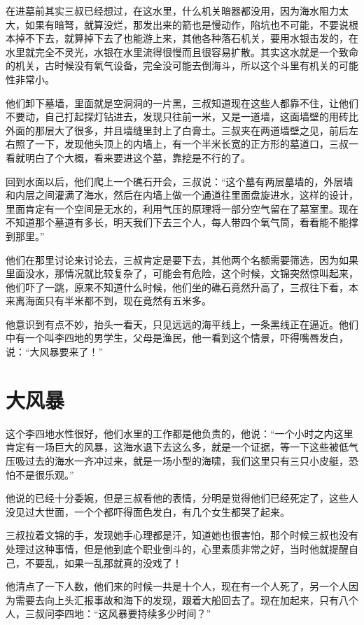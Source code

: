 在进墓前其实三叔已经想过，在这水里，什么机关暗器都没用，因为海水阻力太大，如果有暗弩，就算没烂，那发出来的箭也是慢动作，陷坑也不可能，不要说根本掉不下去，就算掉下去了也能游上来，其他各种落石机关，要用水银击发的，在水里就完全不灵光，水银在水里流得很慢而且很容易扩散。其实这水就是一个致命的机关，古时候没有氧气设备，完全没可能去倒海斗，所以这个斗里有机关的可能性非常小。

他们卸下墓墙，里面就是空洞洞的一片黑，三叔知道现在这些人都靠不住，让他们不要动，自己打起探灯钻进去，发现只往前一米，又是一道墙，这面墙壁的用砖比外面的那层大了很多，并且墙缝里封上了白膏土。三叔夹在两道墙壁之见，前后左右照了一下，发现他头顶上的内墙上，有一个半米长宽的正方形的墓道口，三叔一看就明白了个大概，看来要进这个墓，靠挖是不行的了。

回到水面以后，他们爬上一个礁石开会，三叔说：“这个墓有两层墓墙的，外层墙和内层之间灌满了海水，然后在内墙上做一个通道往里面盘旋进水，这样的设计，里面肯定有一个空间是无水的，利用气压的原理将一部分空气留在了墓室里。现在不知道那个墓道有多长，明天我们下去三个人，每人带四个氧气筒，看看能不能撑到那里。”

他们在那里讨论来讨论去，三叔肯定是要下去，其他两个名额需要筛选，因为如果里面没水，那情况就比较复杂了，可能会有危险，这个时候，文锦突然惊叫起来，他们吓了一跳，原来不知道什么时候，他们坐的礁石竟然升高了，三叔往下看，本来离海面只有半米都不到，现在竟然有五米多。

他意识到有点不妙，抬头一看天，只见远远的海平线上，一条黑线正在逼近。他们中有一个叫李四地的男学生，父母是渔民，他一看到这个情景，吓得嘴唇发白，说：“大风暴要来了！”

\chapter{大风暴}

这个李四地水性很好，他们水里的工作都是他负责的，他说：“一个小时之内这里肯定有一场巨大的风暴，这海水退下去这么多，就是一个证据，等一下这些被低气压吸过去的海水一齐冲过来，就是一场小型的海啸，我们这里只有三只小皮艇，恐怕不是很乐观。”

他说的已经十分委婉，但是三叔看他的表情，分明是觉得他们已经死定了，这些人没见过大世面，一个个都吓得面色发白，有几个女生都哭了起来。

三叔拉着文锦的手，发现她手心理都是汗，知道她也很害怕，那个时候三叔也没有处理过这种事情，但是他到底个职业倒斗的，心里素质非常之好，当时他就提醒自己，不要乱，如果一乱那就真的没戏了！

他清点了一下人数，他们来的时候一共是十个人，现在有一个人死了，另一个人因为需要去向上头汇报事故和海下的发现，跟着大船回去了。现在加起来，只有八个人，三叔问李四地：“这风暴要持续多少时间？”

